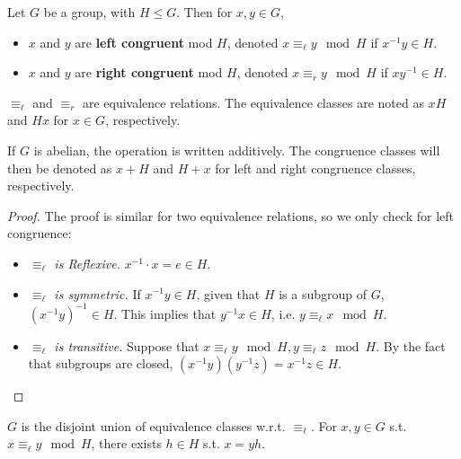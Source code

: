 \documentclass{article}
\begin{document}
\begin{definition}
    Let $G$ be a group, with $H \leq G$. Then for $x, y \in G$,
    \begin{itemize}
        \item $x$ and $y$ are \textbf{left congruent} mod $H$, denoted $x \equiv_{\ell} y \mod H$ if $x^{-1}y \in H$.
        \item $x$ and $y$ are \textbf{right congruent} mod $H$, denoted $x \equiv_{r} y \mod H$ if $xy^{-1} \in H$.
    \end{itemize}
\end{definition}

\begin{remark}
    $\equiv_{\ell}$ and $\equiv_r$ are equivalence relations. The equivalence classes are noted as $xH$ and $Hx$ for $x \in G$, respectively.
\end{remark}

\begin{notation}
    If $G$ is abelian, the operation is written additively. The congruence classes will then be denoted as $x + H$ and $H + x$ for left and right congruence classes, respectively.
\end{notation}

\begin{proof}
    The proof is similar for two equivalence relations, so we only check for left congruence:
    \begin{itemize}
        \item \emph{$\equiv_{\ell}$ is Reflexive.} $x^{-1} \cdot x = e \in H$.
        \item \emph{$\equiv_{\ell}$ is symmetric.} If $x^{-1}y \in H$, given that $H$ is a subgroup of $G$, $(x^{-1}y)^{-1} \in H$. This implies that $y^{-1}x \in H$, i.e. $y \equiv_{\ell} x \mod H$.
        \item \emph{$\equiv_{\ell}$ is transitive.} Suppose that $x \equiv_{\ell} y \mod H, y \equiv_{\ell} z \mod H$. By the fact that subgroups are closed, $(x^{-1}y)(y^{-1}z) = x^{-1}z \in H$.
    \end{itemize}
\end{proof}

\begin{remark}\label{rmk: group as disjoint union of cong classes}
    $G$ is the disjoint union of equivalence classes w.r.t. $\equiv_{\ell}$. For $x, y \in G$ s.t. $x \equiv_{\ell} y \mod H$, there exists $h \in H$ s.t. $x = yh$.
\end{remark}
\end{document}
